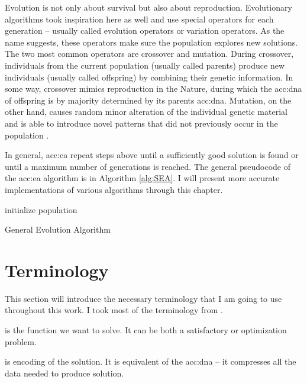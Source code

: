 Evolution is not only about survival but also about reproduction. Evolutionary algorithms took inspiration here as well and use special operators for each generation -- usually called evolution operators or variation operators. As the name suggests, these operators make sure the population explores new solutions. The two most common operators are crossover and mutation. During crossover, individuals from the current population (usually called parents) produce new individuals (usually called offspring) by combining their genetic information. In some way, crossover mimics reproduction in the Nature, during which the \acrshort{acc:dna} of offspring is by majority determined by its parents \acrshort{acc:dna}. Mutation, on the other hand, causes random minor alteration of the individual genetic material and is able to introduce novel patterns that did not previously occur in the population \citep{HowToSolveItModernHeuristics}.

In general, \acrshort{acc:ea} repeat steps above until a sufficiently good solution is found or until a maximum number of generations is reached. The general pseudocode of the \acrshort{acc:ea} algorithm is in Algorithm \ref{alg:SEA}. I will present more accurate implementations of various algorithms through this chapter.

\begin{algorithm}
    \SetAlgoLined
    initialize population\;
    \caption{General Evolution Algorithm}
    \label{alg:SEA}
\end{algorithm}




\section{Terminology}

This section will introduce the necessary terminology that I am going to use throughout this work. I took most of the terminology from \citet{IntroductionToEA}.

 is the function we want to solve. It can be both a satisfactory or optimization problem.

 is encoding of the solution. It is equivalent of the \acrshort{acc:dna} -- it compresses all the data needed to produce solution.

